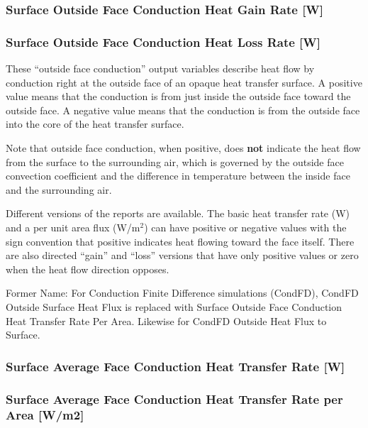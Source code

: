 \subsubsection{Surface Outside Face Conduction Heat Gain Rate {[}W{]}}\label{surface-outside-face-conduction-heat-gain-rate-w}

\subsubsection{Surface Outside Face Conduction Heat Loss Rate {[}W{]}}\label{surface-outside-face-conduction-heat-loss-rate-w}

These ``outside face conduction'' output variables describe heat flow by conduction right at the outside face of an opaque heat transfer surface. A positive value means that the conduction is from just inside the outside face toward the outside face. A negative value means that the conduction is from the outside face into the core of the heat transfer surface.

Note that outside face conduction, when positive, does \textbf{not} indicate the heat flow from the surface to the surrounding air, which is governed by the outside face convection coefficient and the difference in temperature between the inside face and the surrounding air.

Different versions of the reports are available. The basic heat transfer rate (W) and a per unit area flux (W/m\(^{2}\)) can have positive or negative values with the sign convention that positive indicates heat flowing toward the face itself. There are also directed ``gain'' and ``loss'' versions that have only positive values or zero when the heat flow direction opposes.

Former Name: For Conduction Finite Difference simulations (CondFD), CondFD Outside Surface Heat Flux is replaced with Surface Outside Face Conduction Heat Transfer Rate Per Area. Likewise for CondFD Outside Heat Flux to Surface.

\subsubsection{Surface Average Face Conduction Heat Transfer Rate {[}W{]}}\label{surface-average-face-conduction-heat-transfer-rate-w}

\subsubsection{Surface Average Face Conduction Heat Transfer Rate per Area {[}W/m2{]}}\label{surface-average-face-conduction-heat-transfer-rate-per-area-wm2}

